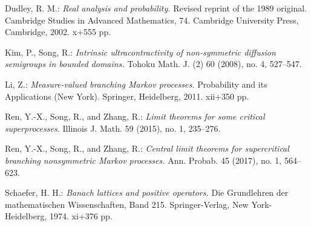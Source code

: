 \documentclass[12pt,a4paper]{amsart}
\numberwithin{equation}{section}
\theoremstyle{plain}
\theoremstyle{definition}
\theoremstyle{remark}
\newcounter{N}
\newcounter{n}[N]
\begin{document}
\begin{thebibliography}{99}

Dudley, R. M.:
\emph{Real analysis and probability.}
Revised reprint of the 1989 original. Cambridge Studies in Advanced Mathematics, 74. Cambridge University Press, Cambridge, 2002. x+555 pp.

Kim, P., Song, R.:
\emph{Intrinsic ultracontractivity of non-symmetric diffusion semigroups in bounded domains.}
Tohoku Math. J. (2) 60 (2008), no. 4, 527–547.

Li, Z.:
\emph{Measure-valued branching Markov processes.}
Probability and its Applications (New York). Springer, Heidelberg, 2011. xii+350 pp.

Ren, Y.-X., Song, R., and Zhang, R.:
\emph{Limit theorems for some critical superprocesses.}
Illinois J. Math. 59 (2015), no. 1, 235–276.

Ren, Y.-X., Song, R., and Zhang, R.:
\emph{Central limit theorems for supercritical branching nonsymmetric Markov processes.}
Ann. Probab. 45 (2017), no. 1, 564–623.

Schaefer, H. H.:
\emph{Banach lattices and positive operators.}
Die Grundlehren der mathematischen Wissenschaften, Band 215. Springer-Verlag, New York-Heidelberg, 1974. xi+376 pp.
\end{thebibliography}
\end{document}
